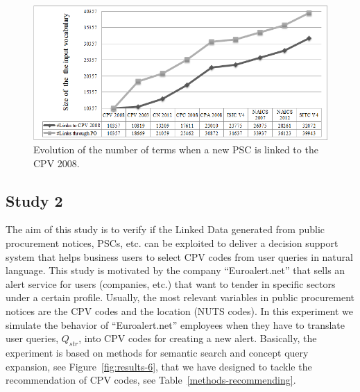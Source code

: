  \begin{figure}[!ht]
\centering
	\includegraphics[width=\textwidth]{./imgs/fig-5}
 \caption{Evolution of the number of terms when a new PSC is linked to the CPV 2008.}
 \label{fig:results-3}
\end{figure}


\subsection{Study 2}
The aim of this study is to verify if the Linked Data generated from public procurement notices, PSCs, etc. can be exploited to deliver a decision 
support system that helps business users to select CPV codes from user queries in natural language. This study is motivated by the company ``Euroalert.net'' 
that sells an alert service for users (companies, etc.) that want to tender in specific sectors under a certain profile. 
Usually, the most relevant variables in public procurement notices are the CPV codes and the location (NUTS codes). In this experiment 
we simulate the behavior of ``Euroalert.net'' employees when they have to translate user queries, $Q_{str}$, into CPV codes for creating a new alert. 
Basically, the experiment is based on methods for semantic search and concept query expansion, see Figure~\ref{fig:results-6}, that we have designed to 
tackle the recommendation of CPV codes, see Table~\ref{methods-recommending}. 

